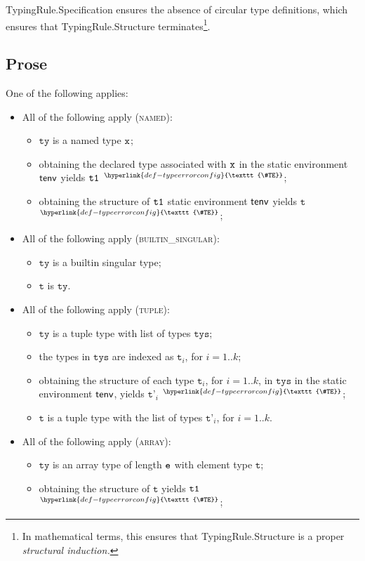 \documentclass{book}
\newcommand\TypeErrorConfig[0]{\hyperlink{def-typeerrorconfig}{\texttt{\#TE}}}
\newcommand\ProseOrTypeError[0]{\hyperlink{def-proseortypeerror}{$^{\TypeErrorConfig}$}}
\newcommand\vt[0]{\texttt{t}}
\newcommand\tty[0]{\texttt{ty}}
\newcommand\vtp[0]{\texttt{t'}}
\newcommand\tys[0]{\texttt{tys}}
\begin{document}
TypingRule.Specification ensures the absence of circular type definitions,
which ensures that TypingRule.Structure terminates\footnote{In mathematical terms,
this ensures that TypingRule.Structure is a proper \emph{structural induction.}}.

\subsection{Prose}
One of the following applies:
\begin{itemize}
\item All of the following apply (\textsc{named}):
  \begin{itemize}
  \item $\tty$ is a named type $\texttt{x}$;
  \item obtaining the declared type associated with $\texttt{x}$ in the static environment $\textsf{tenv}$ yields $\texttt{t1}$ \ProseOrTypeError;
  \item obtaining the structure of $\texttt{t1}$ static environment $\textsf{tenv}$ yields $\vt$ \ProseOrTypeError;
  \end{itemize}
\item All of the following apply (\textsc{builtin\_singular}):
  \begin{itemize}
  \item $\tty$ is a builtin singular type;
  \item $\vt$ is $\tty$.
  \end{itemize}
\item All of the following apply (\textsc{tuple}):
  \begin{itemize}
  \item $\tty$ is a tuple type with list of types $\tys$;
  \item the types in $\tys$ are indexed as $\vt_i$, for $i=1..k$;
  \item obtaining the structure of each type $\vt_i$, for $i=1..k$, in $\tys$ in the static environment $\textsf{tenv}$,
  yields $\vtp_i$ \ProseOrTypeError;
  \item $\vt$ is a tuple type with the list of types $\vtp_i$, for $i=1..k$.
  \end{itemize}
\item All of the following apply (\textsc{array}):
  \begin{itemize}
    \item $\tty$ is an array type of length $\texttt{e}$ with element type $\vt$;
    \item obtaining the structure of $\vt$ yields $\texttt{t1}$ \ProseOrTypeError;

\end{itemize}
\end{itemize}
\end{document}
